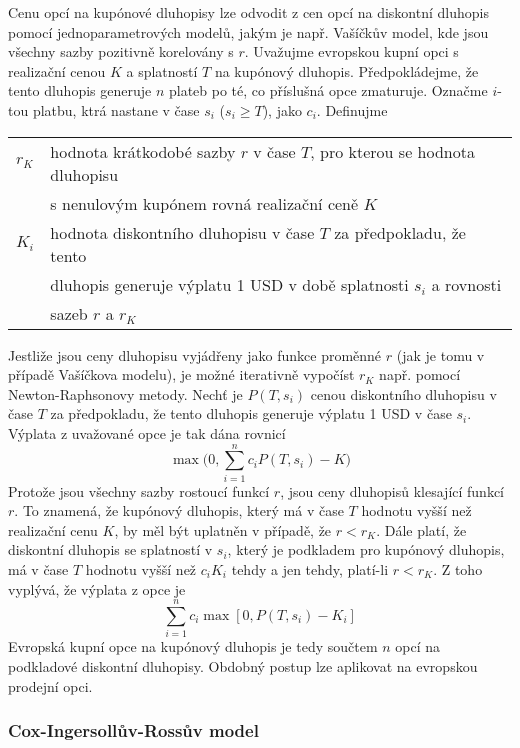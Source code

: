 \documentclass[a4paper]{book}
\begin{document}
Cenu opcí na kupónové dluhopisy lze odvodit z cen opcí na diskontní dluhopis pomocí jednoparametrových modelů, jakým je např. Vašíčkův model, kde jsou všechny sazby pozitivně korelovány s $r$. Uvažujme evropskou kupní opci s realizační cenou $K$ a splatností $T$ na kupónový dluhopis. Předpokládejme, že tento dluhopis generuje $n$ plateb po té, co příslušná opce zmaturuje. Označme $i$-tou platbu, ktrá nastane v čase $s_i$ ($s_i \ge T$), jako $c_i$. Definujme
\begin{center}
\begin{tabular}{l l}
$r_K$ & hodnota krátkodobé sazby $r$ v čase $T$, pro kterou se hodnota dluhopisu\\
 & s nenulovým kupónem rovná realizační ceně $K$\\
$K_i$ & hodnota diskontního dluhopisu v čase $T$ za předpokladu, že tento\\
 & dluhopis generuje výplatu 1 USD v době splatnosti $s_i$ a rovnosti\\
 & sazeb $r$ a $r_K$
\end{tabular}
\end{center}
Jestliže jsou ceny dluhopisu vyjádřeny jako funkce proměnné $r$ (jak je tomu v případě Vašíčkova modelu), je možné iterativně vypočíst $r_K$ např. pomocí Newton-Raphsonovy metody. Nechť je $P(T, s_i)$ cenou diskontního dluhopisu v čase $T$ za předpokladu, že tento dluhopis generuje výplatu 1 USD v čase $s_i$. Výplata z uvažované opce je tak dána rovnicí
\begin{equation*}
\max \bigg( 0, \sum^n_{i=1} c_i P(T, s_i) - K\bigg)
\end{equation*}
Protože jsou všechny sazby rostoucí funkcí $r$, jsou ceny dluhopisů klesající funkcí $r$. To znamená, že kupónový dluhopis, který má v čase $T$ hodnotu vyšší než realizační cenu $K$, by měl být uplatněn v případě, že $r < r_K$. Dále platí, že diskontní dluhopis se splatností v $s_i$, který je podkladem pro kupónový dluhopis, má v čase $T$ hodnotu vyšší než $c_i K_i$ tehdy a jen tehdy, platí-li $r<r_K$. Z toho vyplývá, že výplata z opce je
\begin{equation*}
\sum_{i=1}^n c_i \max [0, P(T, s_i) - K_i]
\end{equation*}
Evropská kupní opce na kupónový dluhopis je tedy součtem $n$ opcí na podkladové diskontní dluhopisy. Obdobný postup lze aplikovat na evropskou prodejní opci.

\subsubsection{Cox-Ingersollův-Rossův model}
\end{document}
